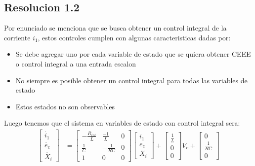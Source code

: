\documentclass[
  11pt,
  letterpaper,
   addpoints,
   answers
  ]{exam}
\begin{document}
\begin{questions}
\begin{solution}
        \subsection*{Resolucion 1.2}
        Por enunciado se menciona que se busca obtener un control integral de la corriente $i_{1}$, estos controles cumplen con algunas caracteristicas dadas por:
        \begin{itemize}
            \item Se debe agregar uno por cada variable de estado que se quiera obtener CEEE o control integral a una entrada escalon
            \item No siempre es posible obtener un control integral para todas las variables de estado
            \item Estos estados no son observables
        \end{itemize}
        Luego tenemos que el sistema en variables de estado con control integral sera:
        \begin{align}
            \begin{bmatrix}
                \dot{i_{1}}\\
                \dot{e_{c}}\\
                \dot{X_{i}}
            \end{bmatrix}
            &=
            \begin{bmatrix}
                -\frac{R_{int}}{L} & \frac{-1}{L} & 0\\
                \frac{1}{C} & -\frac{1}{RC} & 0\\
                1 & 0 & 0
            \end{bmatrix}
            \begin{bmatrix}
                i_{1}\\
                e_{c}\\
                X_{i}
            \end{bmatrix}
            +
            \begin{bmatrix}
                \frac{1}{L}\\
                0\\
                0
            \end{bmatrix}
            V_{c}
            +
            \begin{bmatrix}
                0\\
                \frac{1}{RC}\\
                0
            \end{bmatrix}

\end{align}
\end{solution}
\end{questions}
\end{document}

